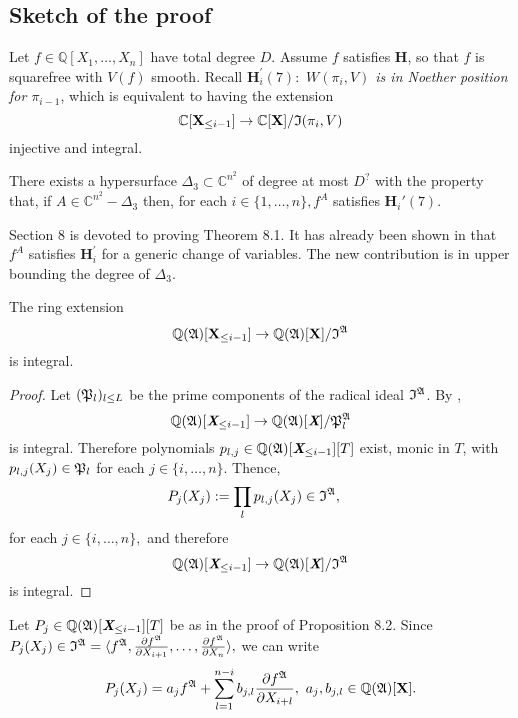 \documentclass[sigconf]{acmart}
\def\Xb{\textit{\textbf{X}}}
\def\C{\mathbb{C}}
\def\I{\frak{I}}
\def\A{\frak{A}}
\def\fp{\frak{P}}
\begin{document}
\subsection{Sketch of the proof}
%
Let $f \in \mathbb{Q}[X_1,\hdots,X_n]$ have total degree $D$. Assume $f$ satisfies \textbf{H}, so that $f$ is squarefree with $V(f)$ smooth. Recall $\textbf{H}_i^{'}(7):$ \textit{$W(\pi_i,V)$ is in Noether position for $\pi_{i-1}$}, which is equivalent to having the extension  
\[
\C[\textbf{X}_{\leq i-1}]\rightarrow\C[\textbf{X}]/\frak{I}(\pi_i,V)
\]
injective and  integral.
%
\begin{theorem}
There exists a hypersurface $\Delta_3 \subset \C^{n^2}$ of degree at most $D^{?}$ with the property that, if $A \in \C^{n^2} - \Delta_3$ then, for each $i \in\{1,\hdots,n\}, f^A$ satisfies $\textbf{H}_i'(7)$.
\end{theorem}
%
Section 8 is devoted to proving Theorem 8.1. It has already been shown in \cite{EMP} that $f^A$ satisfies $\textbf{H}_i^{'}$ for a generic change of variables. The new contribution is in upper bounding the degree of $\Delta_3.$
%
\begin{proposition} 
The ring extension \[\mathbb{Q}(\frak{A})[\textbf{X}_{\leq i-1}]\rightarrow\mathbb{Q}(\frak{A})[\textbf{X}]/\I^{\A}\] is integral.
\end{proposition}
%
\begin{proof}
Let $(\frak{P}_l)_{l \leq L}$ be the prime components of the radical ideal $\I^\A$. By \cite[Proposition 1]{EMP}, 
\[
\mathbb{Q}(\frak{A})[\textit{\textbf{X}}_{\leq i-1}]\rightarrow\mathbb{Q}(\frak{A})[\textit{\textbf{X}}]/\fp_l^{\A}
\] 
is integral. Therefore polynomials $p_{l,j}\in\mathbb{Q}(\frak{A})[\Xb_{\leq i-1}][T]$ exist, monic in $T$, with $p_{l,j}(X_j)\in \frak{P}_l$ for each $j\in \{i,\hdots,n\}.$ Thence, 
%
\begin{align*}
&P_{j}(X_j) := \prod_l p_{l,j}(X_j)\in\I^\A, 
\end{align*}
%
for each $j \in \{i,\hdots,n\},$ and therefore 
\[
\mathbb{Q}(\frak{A})[\textit{\textbf{X}}_{\leq i-1}]\rightarrow\mathbb{Q}(\frak{A})[\textit{\textbf{X}}]/\I^{\A}
\] 
is integral.
\end{proof}
%
Let $P_{j} \in \mathbb{Q}(\frak{A})[\Xb_{\leq i-1}][T]$ be as in the proof of Proposition 8.2. Since $P_{j}(X_j) \in\I^{\A}= \langle f^\A,\frac{\partial f^\A}{\partial X_{i+1}},\hdots,\frac{\partial f^\A}{\partial X_n} \rangle,$
 we can write
\[
P_{j}(X_j) = a_j f^{\A} + \sum_{l=1}^{n-i}b_{j,l} \frac{\partial f^\A}{\partial X_{i+l}}, ~a_j,b_{j,l} \in \mathbb{Q}(\A)[\textbf{X}].
\]
\end{document}
